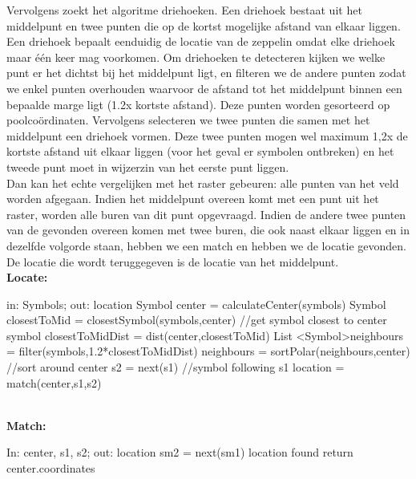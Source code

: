 \documentclass[eind]{penoverslag}
\begin{document}
Vervolgens zoekt het algoritme driehoeken. Een driehoek bestaat uit het middelpunt en twee punten die op de kortst mogelijke afstand van elkaar liggen. Een driehoek bepaalt eenduidig de locatie van de zeppelin omdat elke driehoek maar \'e\'en keer mag voorkomen. Om driehoeken te detecteren kijken we welke punt er het dichtst bij het middelpunt ligt, en filteren we de andere punten zodat we enkel punten overhouden waarvoor de afstand tot het middelpunt binnen een bepaalde marge ligt (1.2x kortste afstand). Deze punten worden gesorteerd op poolcoördinaten. Vervolgens selecteren we twee punten die samen met het middelpunt een driehoek vormen. Deze twee punten mogen wel maximum 1,2x de kortste afstand uit elkaar liggen (voor het geval er symbolen ontbreken) en het tweede punt moet in wijzerzin van het eerste punt liggen.\\

Dan kan het echte vergelijken met het raster gebeuren: alle punten van het veld worden afgegaan. Indien het middelpunt overeen komt met een punt uit het raster, worden alle buren van dit punt opgevraagd. Indien de andere twee punten van de gevonden overeen komen met twee buren, die ook naast elkaar liggen en in dezelfde volgorde staan, hebben we een match en hebben we de locatie gevonden. De locatie die wordt teruggegeven is de locatie van het middelpunt.\\

\textbf{Locate: }
\begin{algorithmic}

	\STATE in: Symbols; out: location
	\STATE Symbol center = calculateCenter(symbols)
	\STATE Symbol closestToMid = closestSymbol(symbols,center)     //get symbol closest to center symbol
	\STATE closestToMidDist = dist(center,closestToMid)
	\STATE List \textless Symbol\textgreater neighbours = filter(symbols,1.2*closestToMidDist)
	\STATE neighbours = sortPolar(neighbours,center)     //sort around center
		\STATE s2 = next(s1) //symbol following s1
			\STATE location = match(center,s1,s2)
		\ENDIF
	\ENDFOR
	
\end{algorithmic}
~\\
\textbf{Match:}
\begin{algorithmic}
\STATE In: center, s1, s2; out: location
				\STATE sm2 = next(sm1)
					\STATE location found
					\STATE return center.coordinates
				\ENDIF
			\ENDFOR
		\ENDIF
	\ENDFOR
\end{algorithmic}
\end{document}
